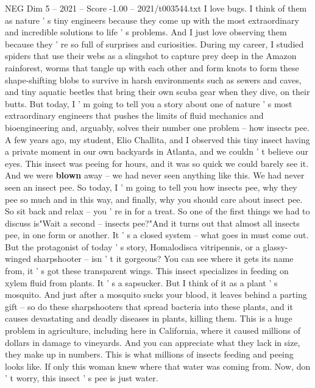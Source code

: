 \begin{textsample}{NEG Dim 5 – 2021 – Score -1.00 – 2021/t003544.txt}  \label{ex:f5_neg_007}
I love bugs.
I think of them as nature ' s tiny engineers because they come up with the most extraordinary and incredible solutions to life ' s problems.
And I just love observing them because they ' re so full of surprises and curiosities.
During my career, I studied spiders that use their webs as a slingshot to capture prey deep in the Amazon rainforest, worms that tangle up with each other and form knots to form these shape-shifting blobs to survive in harsh environments such as sewers and caves, and tiny aquatic beetles that bring their own scuba gear when they dive, on their butts.
But today, I ' m going to tell you a story about one of nature ' s most extraordinary engineers that pushes the limits of fluid mechanics and bioengineering and, arguably, solves their number one problem -- how insects pee.
A few years ago, my student, Elio Challita, and I observed this tiny insect having a private moment in our own backyards in Atlanta, and we couldn ' t believe our eyes.
This insect was peeing for hours, and it was so quick we could barely see it.
And we were \textbf{blown} away -- we had never seen anything like this.
We had never seen an insect pee.
So today, I ' m going to tell you how insects pee, why they pee so much and in this way, and finally, why you should care about insect pee.
So sit back and relax -- you ' re in for a treat.
So one of the first things we had to discuss is"Wait a second -- insects pee?"And it turns out that almost all insects pee, in one form or another.
It ' s a closed system -- what goes in must come out.
But the protagonist of today ' s story, Homalodisca vitripennis, or a glassy-winged sharpshooter -- isn ' t it gorgeous?
You can see where it gets its name from, it ' s got these transparent wings.
This insect specializes in feeding on xylem fluid from plants.
It ' s a sapsucker.
But I think of it as a plant ' s mosquito.
And just after a mosquito sucks your blood, it leaves behind a parting gift -- so do these sharpshooters that spread bacteria into these plants, and it causes devastating and deadly diseases in plants, killing them.
This is a huge problem in agriculture, including here in California, where it caused millions of dollars in damage to vineyards.
And you can appreciate what they lack in size, they make up in numbers.
This is what millions of insects feeding and peeing looks like.
If only this woman knew where that water was coming from.
Now, don ' t worry, this insect ' s pee is just water.

\end{textsample}
